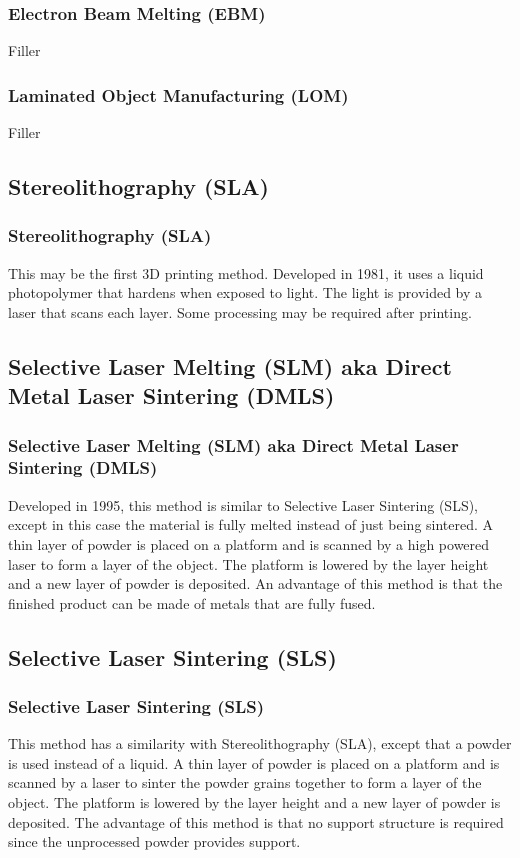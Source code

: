 \documentclass[english,10pt]{beamer}
\begin{document}
\begin{frame}
  \frametitle{Electron Beam Melting (EBM)}
  Filler
\end{frame}

\begin{frame}
  \frametitle{Laminated Object Manufacturing (LOM)}
  Filler
\end{frame}

\subsection{Stereolithography (SLA)}
\begin{frame}
  \frametitle{Stereolithography (SLA)}
  This may be the first 3D printing method.  Developed in 1981, it uses a liquid photopolymer that hardens when exposed to light.  The light is provided by a laser that scans each layer.  Some processing may be required after printing.
\end{frame}

\subsection{Selective Laser Melting (SLM) aka Direct Metal Laser Sintering (DMLS)}
\begin{frame}
  \frametitle{Selective Laser Melting (SLM) aka Direct Metal Laser Sintering (DMLS)}
  Developed in 1995, this method is similar to Selective Laser Sintering (SLS), except in this case the material is fully melted instead of just being sintered.    A thin layer of powder is placed on a platform and is scanned by a high powered laser to form a layer of the object.  The platform is lowered by the layer height and a new layer of powder is deposited.  An advantage of this method is that the finished product can be made of metals that are fully fused.
\end{frame}

\subsection{Selective Laser Sintering (SLS)}
\begin{frame}
  \frametitle{Selective Laser Sintering (SLS)}
  This method has a similarity with Stereolithography (SLA), except that a powder is used instead of a liquid.  A thin layer of powder is placed on a platform and is scanned by a laser to sinter the powder grains together to form a layer of the object.  The platform is lowered by the layer height and a new layer of powder is deposited.  The advantage of this method is that no support structure is required since the unprocessed powder provides support.
\end{frame}
\end{document}
